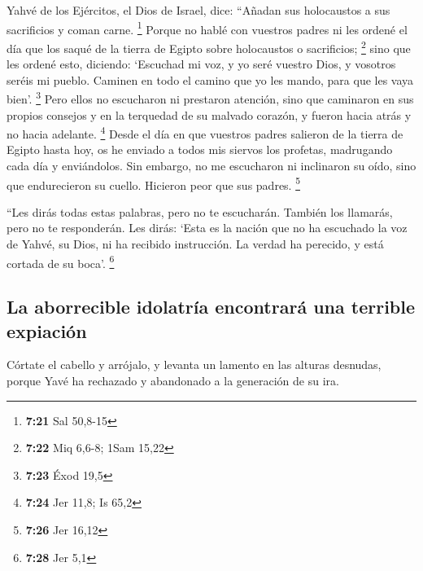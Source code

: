 \begin{paracol}{2}
 Yahvé de los Ejércitos, el Dios de Israel, dice:
``Añadan sus holocaustos a sus sacrificios y coman carne. \footnote{\textbf{7:21}
  Sal 50,8-15}  Porque no hablé con vuestros padres ni
les ordené el día que los saqué de la tierra de Egipto sobre holocaustos
o sacrificios; \footnote{\textbf{7:22} Miq 6,6-8; 1Sam 15,22}
 sino que les ordené esto, diciendo: `Escuchad mi voz, y
yo seré vuestro Dios, y vosotros seréis mi pueblo. Caminen en todo el
camino que yo les mando, para que les vaya bien'. \footnote{\textbf{7:23}
  Éxod 19,5}  Pero ellos no escucharon ni prestaron
atención, sino que caminaron en sus propios consejos y en la terquedad
de su malvado corazón, y fueron hacia atrás y no hacia adelante.
\footnote{\textbf{7:24} Jer 11,8; Is 65,2}  Desde el día
en que vuestros padres salieron de la tierra de Egipto hasta hoy, os he
enviado a todos mis siervos los profetas, madrugando cada día y
enviándolos.  Sin embargo, no me escucharon ni inclinaron
su oído, sino que endurecieron su cuello. Hicieron peor que sus padres.
\footnote{\textbf{7:26} Jer 16,12}

 ``Les dirás todas estas palabras, pero no te escucharán.
También los llamarás, pero no te responderán.  Les dirás:
`Esta es la nación que no ha escuchado la voz de Yahvé, su Dios, ni ha
recibido instrucción. La verdad ha perecido, y está cortada de su boca'.
\footnote{\textbf{7:28} Jer 5,1}

\hypertarget{la-aborrecible-idolatruxeda-encontraruxe1-una-terrible-expiaciuxf3n}{%
\subsection{La aborrecible idolatría encontrará una terrible
expiación}\label{la-aborrecible-idolatruxeda-encontraruxe1-una-terrible-expiaciuxf3n}}

 Córtate el cabello y arrójalo, y levanta un lamento en
las alturas desnudas, porque Yavé ha rechazado y abandonado a la
generación de su ira.


\end{paracol}
